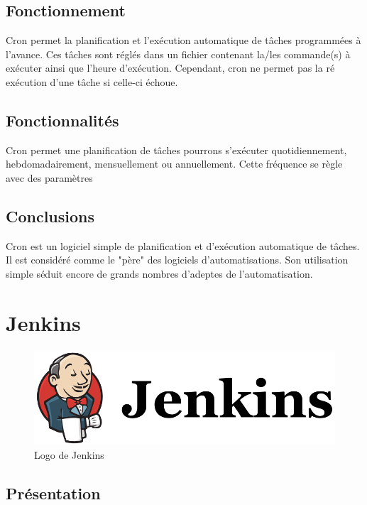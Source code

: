 \documentclass[12pt]{article}
\begin{document}
\subsection{Fonctionnement}
Cron permet la planification et l'exécution automatique de tâches programmées à l'avance. Ces tâches sont réglés dans un fichier contenant la/les commande(s) à exécuter ainsi que l'heure d'exécution. Cependant, cron ne permet pas la ré exécution d'une tâche si celle-ci échoue.

\subsection{Fonctionnalités}
Cron permet une planification de tâches pourrons s'exécuter quotidiennement, hebdomadairement, mensuellement ou annuellement. Cette fréquence se règle avec des paramètres

\subsection{Conclusions}
Cron est un logiciel simple de planification et d'exécution automatique de tâches. Il est considéré comme le "père" des logiciels d'automatisations. Son utilisation simple séduit encore de grands nombres d'adeptes de l'automatisation.

\section{Jenkins}

\begin{figure}[ht]
    \includegraphics[scale=0.5]{images/jenkins.png}
    \caption{Logo de Jenkins}
\end{figure}

\subsection{Présentation}
\end{document}
